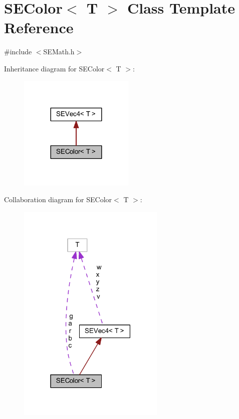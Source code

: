 \section{S\+E\+Color$<$ T $>$ Class Template Reference}
\label{class_s_e_color}


{\ttfamily \#include $<$S\+E\+Math.\+h$>$}



Inheritance diagram for S\+E\+Color$<$ T $>$\+:
\nopagebreak
\begin{figure}[H]
\begin{center}
\leavevmode
\includegraphics[width=156pt]{class_s_e_color__inherit__graph}
\end{center}
\end{figure}


Collaboration diagram for S\+E\+Color$<$ T $>$\+:
\nopagebreak
\begin{figure}[H]
\begin{center}
\leavevmode
\includegraphics[width=199pt]{class_s_e_color__coll__graph}
\end{center}
\end{figure}
